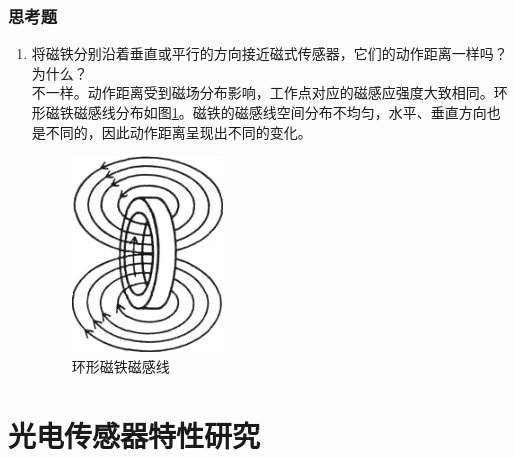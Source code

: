 	\section{思考题}
	\begin{enumerate}
	\item 将磁铁分别沿着垂直或平行的方向接近磁式传感器，它们的动作距离一样吗？为什么？\\
	不一样。动作距离受到磁场分布影响，工作点对应的磁感应强度大致相同。环形磁铁磁感线分布如图\ref{fig:ml}。磁铁的磁感线空间分布不均匀，水平、垂直方向也是不同的，因此动作距离呈现出不同的变化。
	\begin{figure}[htbp]
	\centering
	\includegraphics[width=4cm]{resource/ml.png}
	\caption{环形磁铁磁感线}
	\label{fig:ml}
	\end{figure}
	\end{enumerate}

\part{光电传感器特性研究}

